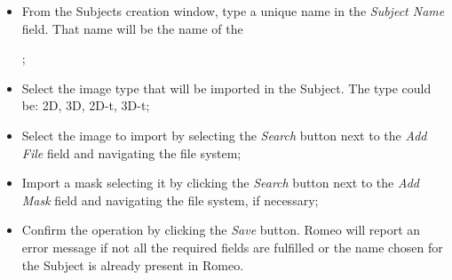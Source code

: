 \begin{itemize}
\item From the Subjects\g{} creation window, type a unique name in the \textit{Subject Name} field. That name will be the name of the \subject{};
\item Select the image type that will be imported in the Subject\g{}. The type could be: 2D, 3D, 2D-t, 3D-t;
\item Select the image to import by selecting the \textit{Search} button next to the \textit{Add File} field and navigating the file system;
\item Import a mask\g{} selecting it by clicking the \textit{Search} button next to the \textit{Add Mask} field and navigating the file system, if necessary;
\item Confirm the operation by clicking the \textit{Save} button. Romeo will report an error message if not all the required fields are fulfilled or the name chosen for the Subject\g{} is already present in Romeo.
\end{itemize}

